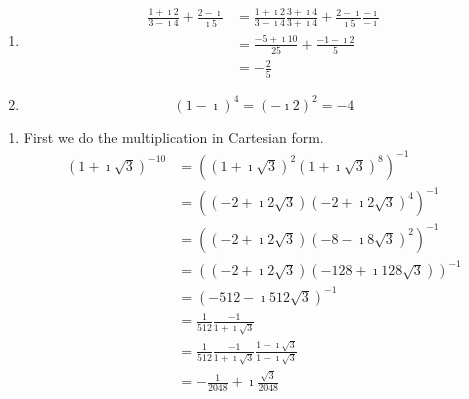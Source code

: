 {%
\begin{Solution}
  \label{solution (1 - i)4 = -4}
  \begin{enumerate}
  \item
    \begin{align*}
      \frac{1 + \imath 2}{3 - \imath 4} + \frac{2 - \imath}{\imath 5} 
      &= \frac{1 + \imath 2}{3 - \imath 4}  \frac{3 + \imath 4}{3 + \imath 4} 
      + \frac{2 - \imath}{\imath 5}  \frac{- \imath}{- \imath} 
      \\
      &= \frac{-5 + \imath 10}{25} + \frac{-1 - \imath 2}{5} 
      \\
      &= - \frac{2}{5}
    \end{align*}
  \item
    \[
    (1 - \imath)^4 = (- \imath 2)^2 = - 4
    \]
  \end{enumerate}
\end{Solution}







\begin{Solution}
  \label{solution (11 + i4)2}
  \begin{enumerate}
  \item
    First we do the multiplication in Cartesian form.
    \begin{align*}
      \left( 1 + \imath \sqrt{3} \right)^{-10}
      &= \left( \left( 1 + \imath \sqrt{3} \right)^2 
        \left( 1 + \imath \sqrt{3} \right)^8 \right)^{-1} 
      \\
      &= \left( \left( - 2 + \imath 2 \sqrt{3} \right) 
        \left( - 2 + \imath 2 \sqrt{3} \right)^4 \right)^{-1} 
      \\
      &= \left( \left( - 2 + \imath 2 \sqrt{3} \right) 
        \left( - 8 - \imath 8 \sqrt{3} \right)^2 \right)^{-1} 
      \\
      &= \left( \left( - 2 + \imath 2 \sqrt{3} \right) 
        \left( - 128 + \imath 128 \sqrt{3} \right) \right)^{-1} 
      \\
      &= \left( - 512 - \imath 512 \sqrt{3} \right)^{-1} 
      \\
      &= \frac{1}{512}  \frac{- 1}{1 + \imath \sqrt{3}} 
      \\
      &= \frac{1}{512}  \frac{- 1}{1 + \imath \sqrt{3}} 
       \frac{1 - \imath \sqrt{3}}{1 - \imath \sqrt{3}} 
      \\
      &= - \frac{1}{2048} + \imath \frac{\sqrt{3}}{2048}
    \end{align*}


\end{enumerate}
\end{Solution}}
